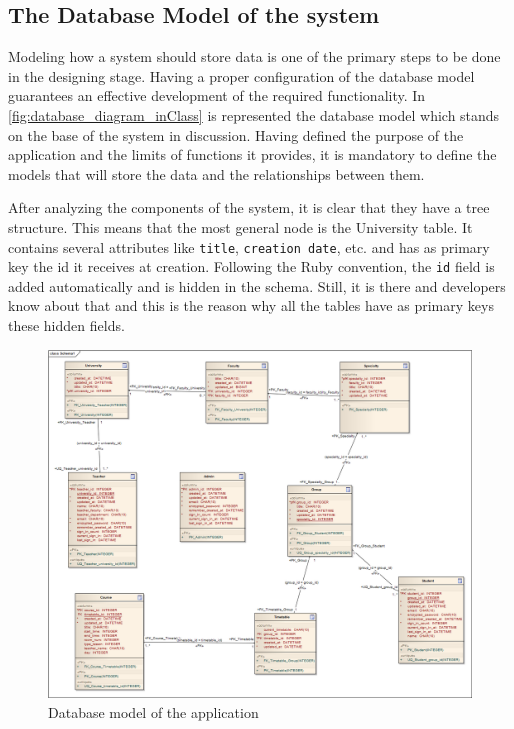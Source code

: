 \newpage
\subsection{The Database Model of the system}
Modeling how a system should store data is one of the primary steps to be done in the designing stage. Having a proper configuration of the database model guarantees an effective development of the required functionality. In \autoref{fig:database_diagram_inClass} 
is represented the database model which stands on the base of the system in discussion. Having defined the purpose of the application and the limits of functions it provides, it is mandatory to define the models that will store the data and the relationships between them. 

After analyzing the components of the system, it is clear that they have a tree structure. This means that the most general node is the University table. It contains several attributes like \texttt{title}, \texttt{creation date}, etc. and has as primary key the id it receives at creation. Following the Ruby convention, the \texttt{id} field is added automatically and is hidden in the schema. Still, it is there and developers know about that and this is the reason why all the tables have as primary keys these hidden fields. 

\begin{figure}[H]
\centering
\includegraphics[width=18cm]{Chapter2/database_diagram_inClass.png}
\caption{Database model of the application}
\label{fig:database_diagram_inClass}
\end{figure}

